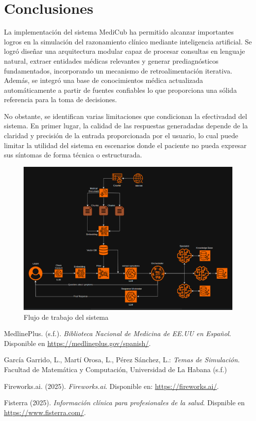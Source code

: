 \documentclass{llncs}
\begin{document}
\section{Conclusiones}

La implementación del sistema MediCub ha permitido alcanzar importantes logros en la simulación del razonamiento clínico mediante inteligencia artificial. Se logró diseñar una arquitectura modular capaz de procesar consultas en lenguaje natural, extraer entidades médicas relevantes
y generar prediagnósticos fundamentados, incorporando un mecanismo de retroalimentación iterativa. Además, se integró una base de conocimientos médica actualizada automáticamente a partir de fuentes confiables lo que proporciona una sólida referencia para la toma de decisiones.

No obstante, se identifican varias limitaciones que condicionan la efectivadad del sistema. En primer lugar, la calidad de las respuestas generadadas depende de la claridad y precisión de la entrada proporcionada por el usuario, lo cual puede limitar la utilidad del sistema en escenarios
donde el paciente no pueda expresar sus síntomas de forma técnica o estructurada.

\begin{figure}  
\begin{center}
  \includegraphics[scale=0.25]{assistant_workflow}
\end{center}
\caption{Flujo de trabajo del sistema}
\end{figure}
  
%
%
\begin{thebibliography}{5}
%
MedlinePlus. (s.f.). \textit{Biblioteca Nacional de Medicina de EE.UU en Español}. Disponible en
\url{https://medlineplus.gov/spanish/}.

García Garrido, L., Martí Orosa, L., Pérez Sánchez, L.: \textit{Temas de Simulación}. Facultad de Matemática y Computación, Universidad de La Habana (s.f.)

Fireworks.ai. (2025). \textit{Fireworks.ai}. Disponible en: \url{https://fireworks.ai/}.

Fisterra (2025). \textit{Información clínica para profesionales de la salud}. Dispnible en \url{https://www.fisterra.com/}.

\end{thebibliography}
\end{document}
